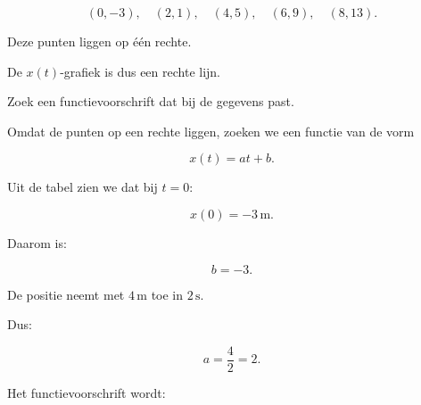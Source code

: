 \documentclass{ximera}
\begin{document}
\begin{oefening}{\oefU\ESS}
\begin{question}
\begin{oplossing}
  \[
  (0,-3),\quad
  (2,1),\quad
  (4,5),\quad
  (6,9),\quad
  (8,13).
  \]
  
  Deze punten liggen op één rechte.
  
  \begin{center}
  \end{center}
  
  De $x(t)$-grafiek is dus een rechte lijn.
  \end{oplossing}
  \end{question}
  
  
  \begin{question}
  Zoek een functievoorschrift dat bij de gegevens past.
  
  \begin{oplossing}
  Omdat de punten op een rechte liggen, zoeken we een functie van de vorm
  
  \[
  x(t)=at+b.
  \]
  
  Uit de tabel zien we dat bij $t=0$:
  
  \[
  x(0)=-3\,\mathrm{m}.
  \]
  
  Daarom is:
  
  \[
  b=-3.
  \]
  
  De positie neemt met $4\,\mathrm{m}$ toe in $2\,\mathrm{s}$.
  
  Dus:
  
  \[
  a=\frac{4}{2}=2.
  \]
  
  Het functievoorschrift wordt:
  

\end{oplossing}
\end{question}
\end{oefening}
\end{document}
